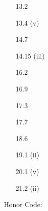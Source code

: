 \documentclass[11pt]{article}
\begin{document}
\begin{enumerate}
    \item[13.2] 

    \hrulefill

    \item[13.4](v)

    \hrulefill

    \item[14.7]

    \hrulefill

    \item[14.15](iii)

    \hrulefill

    \item[16.2]

    \hrulefill

    \item[16.9]

    \hrulefill

    \item[17.3]

    \hrulefill

    \item[17.7]

    \hrulefill

    \item[18.6]

    \hrulefill

    \item[19.1](ii)

    \hrulefill

    \item[20.1](v)

    \hrulefill

    \item[21.2](ii)

    \hrulefill

\end{enumerate}
Honor Code: \vspace*{7em}
\end{document}
